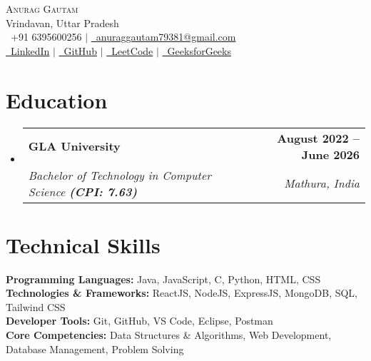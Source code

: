 \documentclass[letterpaper,11pt]{article}
\makeatletter
\newcommand{\resumeSubheading}[4]{
  \vspace{-1pt}\item
    \begin{tabular*}{1.0\textwidth}[t]{l@{\extracolsep{\fill}}r}
      \textbf{\color{accent}#1} & \textbf{\small\color{secondary}#2} \\
      \textit{\small\color{secondary}#3} & \textit{\small\color{secondary}#4} \\
    \end{tabular*}\vspace{-6pt}
}
\newcommand{\resumeSubHeadingListStart}{\begin{itemize}[leftmargin=0.0in, label={}]}
\newcommand{\resumeSubHeadingListEnd}{\end{itemize}}
\makeatother
\begin{document}
\begin{center}
    {\Huge\scshape\color{primary}Anurag Gautam} \\ 
    \vspace{4pt}
    {\color{secondary}Vrindavan, Uttar Pradesh} \\ 
    \vspace{6pt}
    \small\color{secondary}
    \raisebox{-0.1\height}\faPhone\ +91 6395600256
    \hspace{1em} $|$ \hspace{1em}
    \href{mailto:anuraggautam79381@gmail.com}{\raisebox{-0.2\height}\faEnvelope\ anuraggautam79381@gmail.com}
    \\ \vspace{4pt}
    \href{https://www.linkedin.com/in/anurag-gautam-258519252/}{\raisebox{-0.2\height}\faLinkedin\ LinkedIn}
    \hspace{1em} $|$ \hspace{1em}
    \href{https://github.com/anuraggautam79381}{\raisebox{-0.2\height}\faGithub\ GitHub}
    \hspace{1em} $|$ \hspace{1em}
    \href{https://leetcode.com/u/AnuragGautam02/}{\raisebox{-0.2\height}\faCode\ LeetCode}
    \hspace{1em} $|$ \hspace{1em}
    \href{https://www.geeksforgeeks.org/user/anuraggautam12/}{\raisebox{-0.2\height}\faCode\ GeeksforGeeks}
\end{center}
\vspace{-6pt}

\section{Education}
\resumeSubHeadingListStart
    \resumeSubheading
        {GLA University}{August 2022 -- June 2026}
        {Bachelor of Technology in Computer Science \textbf{(CPI: 7.63)}}{Mathura, India}
\resumeSubHeadingListEnd

\section{Technical Skills}
\begin{itemize}[leftmargin=0.15in, label={}]
    \small{\item{
        \textbf{\color{accent}Programming Languages:} Java, JavaScript, C, Python, HTML, CSS \\[3pt]
        \textbf{\color{accent}Technologies \& Frameworks:} ReactJS, NodeJS, ExpressJS, MongoDB, SQL, Tailwind CSS \\[3pt]
        \textbf{\color{accent}Developer Tools:} Git, GitHub, VS Code, Eclipse, Postman \\[3pt]
        \textbf{\color{accent}Core Competencies:} Data Structures \& Algorithms, Web Development, Database Management, Problem Solving
    }}
\end{itemize}
\vspace{-12pt}
\end{document}
